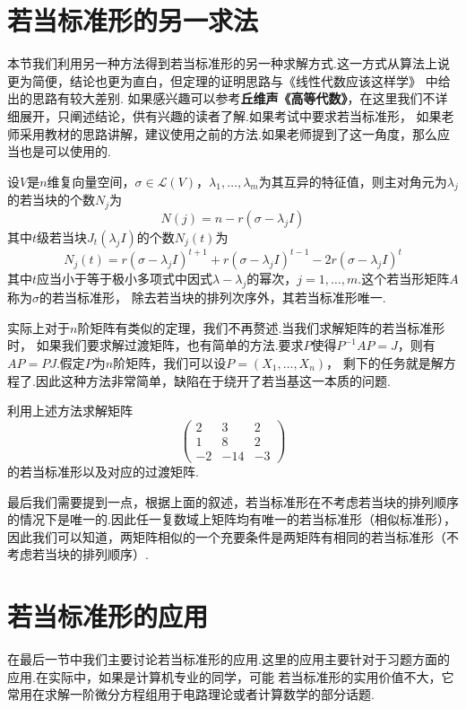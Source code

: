 \section{若当标准形的另一求法}\label{sect:18:若当标准形的另一求法}
本节我们利用另一种方法得到若当标准形的另一种求解方式.这一方式从算法上说更为简便，结论也更为直白，但定理的证明思路与《线性代数应该这样学》
中给出的思路有较大差别.
如果感兴趣可以参考\textbf{丘维声《高等代数》}，在这里我们不详细展开，只阐述结论，供有兴趣的读者了解.如果考试中要求若当标准形，
如果老师采用教材的思路讲解，建议使用之前的方法.如果老师提到了这一角度，那么应当也是可以使用的.
\begin{theorem}
    设$V$是$n$维复向量空间，$\sigma\in \mathcal{L}(V)$，$\lambda_1,\ldots,\lambda_m$为其互异的特征值，则主对角元为$\lambda_j$的若当块的个数$N_j$为
    \[N(j)=n-r(\sigma-\lambda_jI)\]
    其中$t$级若当块$J_t(\lambda_jI)$的个数$N_j(t)$为
    \[N_j(t)=r(\sigma-\lambda_jI)^{t+1}+r(\sigma-\lambda_jI)^{t-1}-2r(\sigma-\lambda_jI)^t\]
    其中$t$应当小于等于极小多项式中因式$\lambda-\lambda_j$的幂次，$j=1,\ldots,m$.这个若当形矩阵$A$称为$\sigma$的若当标准形，
    除去若当块的排列次序外，其若当标准形唯一.
\end{theorem}
实际上对于$n$阶矩阵有类似的定理，我们不再赘述.当我们求解矩阵的若当标准形时，
如果我们要求解过渡矩阵，也有简单的方法.要求$P$使得$P^{-1}AP=J$，则有$AP=PJ$.假定$P$为$n$阶矩阵，我们可以设$P=(X_1,\ldots,X_n)$，
剩下的任务就是解方程了.因此这种方法非常简单，缺陷在于绕开了若当基这一本质的问题.
\begin{example}
    利用上述方法求解矩阵\[\begin{pmatrix}
        2 & 3 & 2 \\ 1 & 8 & 2 \\ -2 & -14 & -3
    \end{pmatrix}\]的若当标准形以及对应的过渡矩阵.
\end{example}
\begin{solution}

\end{solution}

最后我们需要提到一点，根据上面的叙述，若当标准形在不考虑若当块的排列顺序的情况下是唯一的.因此任一复数域上矩阵均有唯一的若当标准形（相似标准形），
因此我们可以知道，两矩阵相似的一个充要条件是两矩阵有相同的若当标准形（不考虑若当块的排列顺序）.

\section{若当标准形的应用}
在最后一节中我们主要讨论若当标准形的应用.这里的应用主要针对于习题方面的应用.在实际中，如果是计算机专业的同学，可能
若当标准形的实用价值不大，它常用在求解一阶微分方程组用于电路理论或者计算数学的部分话题.

